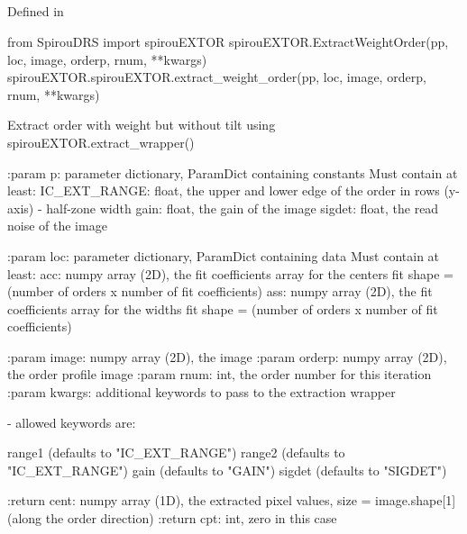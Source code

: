 
\begin{minipage}{\textwidth}
\subsection{}

Defined in \spirouEXTOR{}

\begin{pythonbox}
from SpirouDRS import spirouEXTOR
spirouEXTOR.ExtractWeightOrder(pp, loc, image, orderp, rnum, **kwargs)
spirouEXTOR.spirouEXTOR.extract_weight_order(pp, loc, image, orderp, rnum, **kwargs)
\end{pythonbox}

\begin{pythondocstring}
Extract order with weight but without tilt using
spirouEXTOR.extract_wrapper()

:param p: parameter dictionary, ParamDict containing constants
    Must contain at least:
            IC_EXT_RANGE: float, the upper and lower edge of the order
                          in rows (y-axis) - half-zone width
            gain: float, the gain of the image
            sigdet: float, the read noise of the image

:param loc: parameter dictionary, ParamDict containing data
        Must contain at least:
            acc: numpy array (2D), the fit coefficients array for
                  the centers fit
                  shape = (number of orders x number of fit coefficients)
            ass: numpy array (2D), the fit coefficients array for
                  the widths fit
                  shape = (number of orders x number of fit coefficients)

:param image: numpy array (2D), the image
:param orderp: numpy array (2D), the order profile image
:param rnum: int, the order number for this iteration
:param kwargs: additional keywords to pass to the extraction wrapper

        - allowed keywords are:

        range1  (defaults to "IC_EXT_RANGE")
        range2  (defaults to "IC_EXT_RANGE")
        gain    (defaults to "GAIN")
        sigdet  (defaults to "SIGDET")

:return cent: numpy array (1D), the extracted pixel values,
             size = image.shape[1] (along the order direction)
:return cpt: int, zero in this case
\end{pythondocstring}
\end{minipage}



